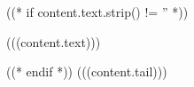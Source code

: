 ((* if content.text.strip() != '' *))
\begin{visit}
(((content.text)))
\end{visit}
((* endif *))
(((content.tail)))
